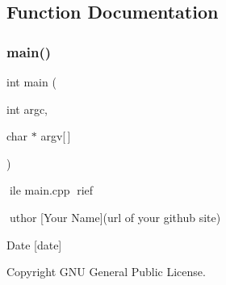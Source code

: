 \subsection{Function Documentation}
\hypertarget{ocra-icub-clients_2sitting-demo_2src_2main_8cpp_a0ddf1224851353fc92bfbff6f499fa97}{}\label{ocra-icub-clients_2sitting-demo_2src_2main_8cpp_a0ddf1224851353fc92bfbff6f499fa97} 
\subsubsection{\texorpdfstring{main()}{main()}}
{\footnotesize\ttfamily int main (\begin{DoxyParamCaption}\item[{int}]{argc,  }\item[{char $\ast$}]{argv\mbox{[}$\,$\mbox{]} }\end{DoxyParamCaption})}

ile main.\+cpp rief

uthor \mbox{[}Your Name\mbox{]}(url of your github site) \begin{DoxyDate}{Date}
\mbox{[}date\mbox{]} 
\end{DoxyDate}
\begin{DoxyCopyright}{Copyright}
G\+NU General Public License. 
\end{DoxyCopyright}
